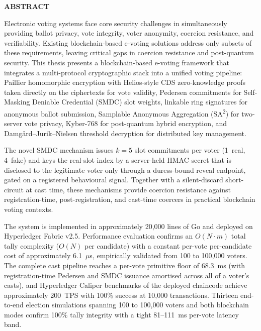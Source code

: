 \newpage
\thispagestyle{plain}
\begin{center}
{\Large \textbf{ABSTRACT}}
\end{center}
\vspace{1cm}

Electronic voting systems face core security challenges in simultaneously providing ballot privacy, vote integrity, voter anonymity, coercion resistance, and verifiability. Existing blockchain-based e-voting solutions address only subsets of these requirements, leaving critical gaps in coercion resistance and post-quantum security. This thesis presents a blockchain-based e-voting framework that integrates a multi-protocol cryptographic stack into a unified voting pipeline: Paillier homomorphic encryption with Helios-style CDS zero-knowledge proofs taken directly on the ciphertexts for vote validity, Pedersen commitments for Self-Masking Deniable Credential (SMDC) slot weights, linkable ring signatures for anonymous ballot submission, Samplable Anonymous Aggregation (SA\textsuperscript{2}) for two-server vote privacy, Kyber-768 for post-quantum hybrid encryption, and Damg\aa rd--Jurik--Nielsen threshold decryption for distributed key management.

The novel SMDC mechanism issues $k=5$ slot commitments per voter (1~real, 4~fake) and keys the real-slot index by a server-held HMAC secret that is disclosed to the legitimate voter only through a duress-bound reveal endpoint, gated on a registered behavioural signal. Together with a silent-discard short-circuit at cast time, these mechanisms provide coercion resistance against registration-time, post-registration, and cast-time coercers in practical blockchain voting contexts.

The system is implemented in approximately 20{,}000 lines of Go and deployed on Hyperledger Fabric v2.5. Performance evaluation confirms an $O(N \cdot m)$ total tally complexity ($O(N)$ per candidate) with a constant per-vote per-candidate cost of approximately 6.1~$\mu$s, empirically validated from 100 to 100{,}000 voters. The complete cast pipeline reaches a per-vote primitive floor of 68.3~ms (with registration-time Pedersen and SMDC issuance amortised across all of a voter's casts), and Hyperledger Caliper benchmarks of the deployed chaincode achieve approximately 200~TPS with 100\% success at 10{,}000 transactions. Thirteen end-to-end election simulations spanning 100 to 100{,}000 voters and both blockchain modes confirm 100\% tally integrity with a tight 81--111~ms per-vote latency band.

